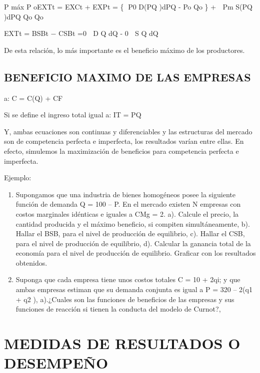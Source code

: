\documentclass[
  letterpaper,
  DIV=11,
  numbers=noendperiod]{scrartcl}
\begin{document}
P máx P oEXTt = EXCt + EXPt = \{׬ P0 D(PQ )dPQ - Po Qo \} + ׬ Pm S(PQ
)dPQ Qo Qo

EXTt = BSBt − CSBt =׬ 0 D Q dQ - ׬ 0 S Q dQ

De esta relación, lo más importante es el beneficio máximo de los
productores.

\hypertarget{beneficio-maximo-de-las-empresas}{%
\subsection{BENEFICIO MAXIMO DE LAS
EMPRESAS}\label{beneficio-maximo-de-las-empresas}}

a: C = C(Q) + CF

Si se define el ingreso total igual a: IT = PQ

Y, ambas ecuaciones son continuas y diferenciables y las estructuras del
mercado son de competencia perfecta e imperfecta, los resultados varían
entre ellas. En efecto, simulemos la maximización de beneficios para
competencia perfecta e imperfecta.

Ejemplo:

\begin{enumerate}
\def\labelenumi{\arabic{enumi}.}
\item
  Supongamos que una industria de bienes homogéneos posee la siguiente
  función de demanda Q = 100 -- P. En el mercado existen N empresas con
  costos marginales idénticas e iguales a CMg = 2. a). Calcule el
  precio, la cantidad producida y el máximo beneficio, si compiten
  simultáneamente, b). Hallar el BSB, para el nivel de producción de
  equilibrio, c). Hallar el CSB, para el nivel de producción de
  equilibrio, d). Calcular la ganancia total de la economía para el
  nivel de producción de equilibrio. Graficar con los resultados
  obtenidos.
\item
  Suponga que cada empresa tiene unos costos totales C = 10 + 2qi; y que
  ambas empresas estiman que su demanda conjunta es igual a P = 320 --
  2(q1 + q2 ), a).¿Cuales son las funciones de beneficios de las
  empresas y sus funciones de reacción si tienen la conducta del modelo
  de Curnot?,
\end{enumerate}

\hypertarget{medidas-de-resultados-o-desempeuxf1o}{%
\section{MEDIDAS DE RESULTADOS O
DESEMPEÑO}\label{medidas-de-resultados-o-desempeuxf1o}}
\end{document}
